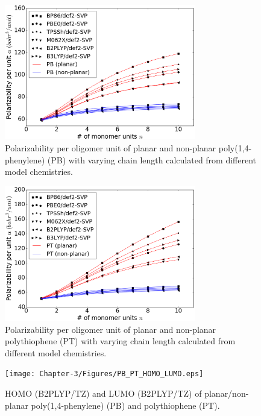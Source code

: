 \begin{figure}[htbp] 
	\centering
	\includegraphics[width=0.744\textwidth]{Chapter-3/Figures/C_NC_PB.eps}
	\caption{Polarizability per oligomer unit of planar and non-planar poly(1,4-phenylene) (PB) with varying chain length calculated from different model chemistries.} 
	\label{fig:C_NC_PB} 
\end{figure}  

\begin{figure}[htbp] 
	\centering
	\includegraphics[width=0.744\textwidth]{Chapter-3/Figures/C_NC_PT.eps}
	\caption{Polarizability per oligomer unit of planar and non-planar polythiophene (PT) with varying chain length calculated from different model chemistries.} 
	\label{fig:C_NC_PT} 
\end{figure}  

\begin{figure}[htbp] 
	\centering
	\texttt{[image: Chapter-3/Figures/PB\_PT\_HOMO\_LUMO.eps]}
	\caption{HOMO (B2PLYP/TZ) and LUMO (B2PLYP/TZ) of planar/non-planar poly(1,4-phenylene) (PB) and polythiophene (PT).} 
	\label{fig:PB_PT_HOMO_LUMO} 
\end{figure}  

